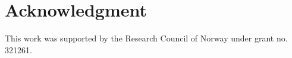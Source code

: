 \documentclass[journal]{IEEEtran}
\begin{document}
\section*{Acknowledgment}

This work was supported by the Research Council of Norway under grant no. 321261.


\ifCLASSOPTIONcaptionsoff
  \newpage
\fi






% 
{}
%



% 
\end{document}
